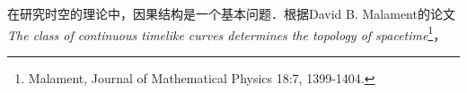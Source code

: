 
在研究时空的理论中，因果结构是一个基本问题．根据David B. Malament的论文\textit{The class of continuous timelike curves determines the topology of spacetime}\footnote{Malament, Journal of Mathematical Physics 18:7, 1399-1404. }，




